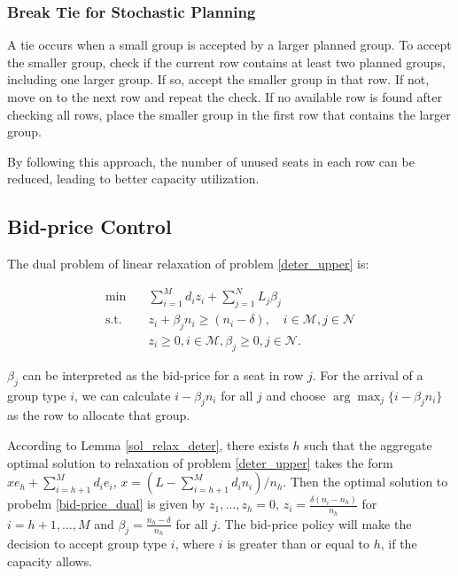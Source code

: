 \subsubsection{Break Tie for Stochastic Planning}
A tie occurs when a small group is accepted by a larger planned group. To accept the smaller group, check if the current row contains at least two planned groups, including one larger group. If so, accept the smaller group in that row. If not, move on to the next row and repeat the check. If no available row is found after checking all rows, place the smaller group in the first row that contains the larger group.

By following this approach, the number of unused seats in each row can be reduced, leading to better capacity utilization.

\subsection{Bid-price Control}
The dual problem of linear relaxation of problem \eqref{deter_upper} is:

\begin{equation}\label{bid-price_dual}
  \begin{aligned}
  \min \quad & \sum_{i=1}^{M} d_i z_i + \sum_{j= 1}^{N} L_j \beta_{j} \\
  \text {s.t.} \quad & z_{i} + \beta_j n_i \geq (n_i-\delta), \quad i \in \mathcal{M}, j \in \mathcal{N} \\
  & z_{i} \geq 0, i \in \mathcal{M}, \beta_{j} \geq 0, j \in \mathcal{N}.
  \end{aligned}
\end{equation}

$\beta_{j}$ can be interpreted as the bid-price for a seat in row $j$. For the arrival of a group type $i$, we can calculate $i -\beta_{j} n_i$ for all $j$ and choose $\arg \max_{j} \{i -\beta_{j} n_i\}$ as the row to allocate that group.


\begin{lem}
According to Lemma \ref{sol_relax_deter}, there exists $h$ such that the aggregate optimal solution to relaxation of problem \eqref{deter_upper} takes the form $x e_{h} + \sum_{i=h+1} ^{M} d_{i} e_{i}$, $x = (L- \sum_{i = h+1}^{M} {d_i n_i})/ n_h$. Then the optimal solution to probelm \eqref{bid-price_dual} is given by $z_1 ,\ldots, z_h =0$, $z_{i} = \frac{\delta(n_i-n_h)}{n_h}$ for $i = h+1, \ldots, M$ and $\beta_j = \frac{n_h - \delta}{n_h}$ for all $j$. The bid-price policy will make the decision to accept group type $i$, where $i$ is greater than or equal to $h$, if the capacity allows.
\end{lem}

